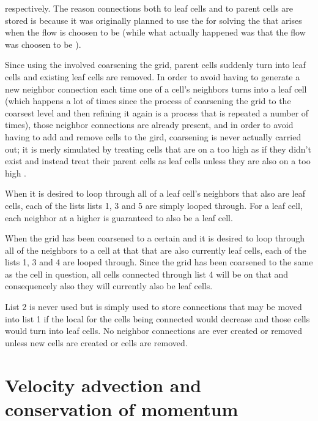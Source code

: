 respectively. The reason connections both to leaf cells and to parent cells are stored is because it was originally planned to use the  for solving the  that arises when the flow is choosen to be  (while what actually happened was that the flow was choosen to be ).

Since using the  involved coarsening the grid, parent cells suddenly turn into leaf cells and existing leaf cells are removed. In order to avoid having to generate a new neighbor connection each time one of a cell's neighbors turns into a leaf cell (which happens a lot of times since the process of coarsening the grid to the coarsest level and then refining it again is a process that is repeated a number of times), those neighbor connections are already present, and in order to avoid having to add and remove cells to the gird, coarsening is never actually carried out; it is merly simulated by treating cells that are on a too high \LOD as if they didn't exist and instead treat their parent cells as leaf cells unless they are also on a too high \LOD.

When it is desired to loop through all of a leaf cell's neighbors that also are leaf cells, each of the lists lists 1, 3 and 5 are simply looped through. For a leaf cell, each neighbor at a higher \LOD is guaranteed to also be a leaf cell.

When the grid has been coarsened to a certain \LOD and it is desired to loop through all of the neighbors to a cell at that \LOD that are also currently leaf cells, each of the lists 1, 3 and 4 are looped through. Since the grid has been coarsened to the same \LOD as the cell in question, all cells connected through list 4 will be on that \LOD and consequencely also they will currently also be leaf cells.

List 2 is never used but is simply used to store connections that may be moved into list 1 if the local \LOD for the cells being connected would decrease and those cells would turn into leaf cells. No neighbor connections are ever created or removed unless new cells are created or cells are removed.

\section{Velocity advection and conservation of momentum}

